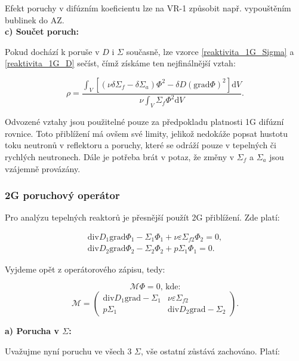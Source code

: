 Efekt poruchy v difúzním koeficientu lze na VR-1 způsobit např. vypouštěním bublinek do AZ.\\

\textbf{c) Součet poruch:}

Pokud dochází k poruše v $D$ i $\Sigma$ současně, lze vzorce \eqref{reaktivita_1G_Sigma} a \eqref{reaktivita_1G_D} sečíst, čímž získáme ten nejfinálnější vztah:

\begin{equation}
  \boxed{
  \rho = \dfrac{\int_V [(\nu \delta \Sigma_f - \delta \Sigma_a) \Phi^2 - \delta D (\text{grad}\Phi)^2] \text{d}V}{\nu \int_V \Sigma_f \Phi^2 \text{d}V}.
  \label{reaktivita_1G}}
\end{equation}

Odvozené vztahy jsou použitelné pouze za předpokladu platnosti 1G difúzní rovnice. Toto přiblížení má ovšem své limity, jelikož nedokáže popsat hustotu toku neutronů v reflektoru a poruchy, které se odráží pouze v tepelných či rychlých neutronech. Dále je potřeba brát v potaz, že změny v $\Sigma_f$ a $\Sigma_a$ jsou vzájemně provázány.

\subsubsection{2G poruchový operátor}

Pro analýzu tepelných reaktorů je přesnější použít 2G přiblížení. Zde platí:

\begin{equation}
  \begin{matrix}
  \text{div} D_1 \text{grad} \Phi_1 - \Sigma_1 \Phi_1 + \nu \varepsilon \Sigma_{f2} \Phi_2 = 0, \\
  \text{div} D_2 \text{grad} \Phi_2 - \Sigma_2 \Phi_2 + p \Sigma_1 \Phi_1 = 0.
  \end{matrix}
  \label{1G_difuzka}
\end{equation}

Vyjdeme opět z operátorového zápisu, tedy:

$$ \mathcal{M} \Phi = 0 \text{, kde:} $$
$$ \mathcal{M} = \begin{pmatrix} \text{div} D_1 \text{grad} -\Sigma_1 & \nu \varepsilon \Sigma_{f2} \\ p \Sigma_1 & \text{div} D_2 \text{grad} - \Sigma_2 \end{pmatrix}. $$

\textbf{a) Porucha v $\Sigma$:}

Uvažujme nyní poruchu ve všech 3 $\Sigma$, vše ostatní zůstává zachováno. Platí:

